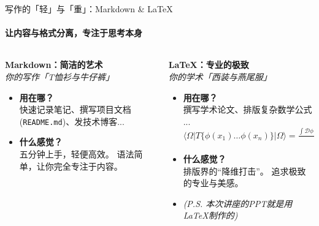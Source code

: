 \documentclass{beamer}
\begin{document}
\begin{frame}{写作的「轻」与「重」：Markdown \& LaTeX}
    \framesubtitle{让内容与格式分离，专注于思考本身}

    \begin{columns}[T]
        \begin{column}{0.5\textwidth}
            \begin{center}
                \Large\textbf{Markdown：简洁的艺术}
                \vspace{0.2cm}
                \\
                \large \textit{你的写作「T恤衫与牛仔裤」}
            \end{center}
            
            \begin{itemize}
                \item \textbf{用在哪？} \\
                \small 快速记录笔记、撰写项目文档(\texttt{README.md})、发技术博客...
                \item \textbf{什么感觉？} \\
                \small \alert{五分钟上手，轻便高效。} 语法简单，让你完全专注于内容。
            \end{itemize}
        \end{column}

        \begin{column}{0.5\textwidth}
            \begin{center}
                \Large\textbf{LaTeX：专业的极致}
                \vspace{0.2cm}
                \\
                \large \textit{你的学术「西装与燕尾服」}
            \end{center}
            
            \begin{itemize}
                \item \textbf{用在哪？} \\
                \small 撰写学术论文、排版复杂数学公式 ...\\
                $
        \langle \Omega | T \{ \phi(x_1) \dots \phi(x_n) \} | \Omega \rangle = \frac{\int \mathcal{D}\phi \, \phi(x_1) \dots \phi(x_n) \exp \left( i S[\phi] \right)}{\int \mathcal{D}\phi \, \exp \left( i S[\phi] \right)}
                $
                \item \textbf{什么感觉？} \\
                \small \alert{排版界的“降维打击”。} 追求极致的专业与美感。
                \item \footnotesize \textit{(P.S. 本次讲座的PPT就是用LaTeX制作的)}
            \end{itemize}
        \end{column}
    \end{columns}

\end{frame}
\end{document}
